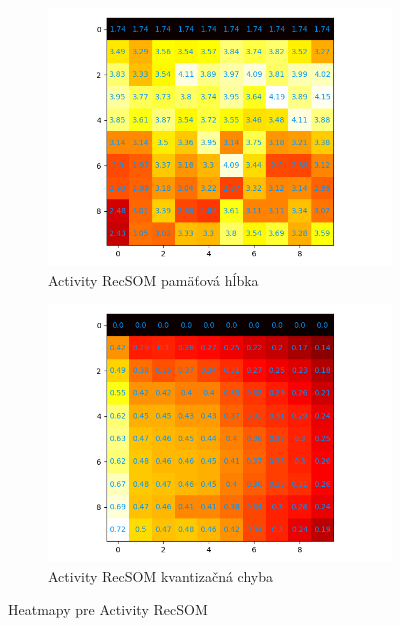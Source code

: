 \begin{figure}[H]
    \centering
    \begin{subfigure}{.5\textwidth}
        \centering
        \includegraphics[width=\linewidth]{assets/activity_recsom_memory_span}
        \caption{Activity RecSOM pamäťová hĺbka}
        \label{fig:sub1}
    \end{subfigure}%
    \begin{subfigure}{.5\textwidth}
        \centering
        \includegraphics[width=\linewidth]{assets/activity_recsom_quantization_errors}
        \caption{Activity RecSOM kvantizačná chyba}
        \label{fig:sub2}
    \end{subfigure}
    \caption{Heatmapy pre Activity RecSOM}
    \label{fig:test}
\end{figure}
    

